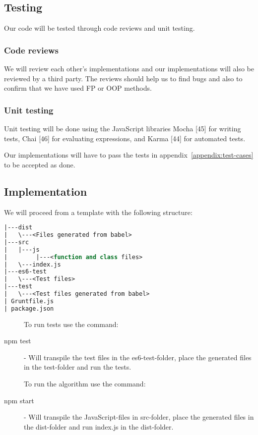 \documentclass {article}
\begin{document}
\subsection{Testing}
Our code will be tested through code reviews and unit testing.
\subsubsection{Code reviews}
We will review each other’s implementations and our implementations will also be reviewed by a third party. The reviews should help us to find bugs and also to confirm that we have used FP or OOP methods.
\subsubsection{Unit testing}
Unit testing will be done using the JavaScript libraries Mocha [45] for writing tests, Chai [46] for evaluating expressions, and Karma [44] for automated tests.

Our implementations will have to pass the tests in appendix~\ref{appendix:test-cases} to be accepted as done.
\subsection{Implementation}
We will proceed from a template with the following structure:

\begin{lstlisting}[language=Pascal, deletekeywords={function, and}, numbers=none]
|---dist
|   \---<Files generated from babel>
|---src
|   |---js
|        |---<function and class files>
|   \---index.js
|---es6-test
|   \---<Test files>
|---test
|   \---<Test files generated from babel>
| Gruntfile.js
| package.json
\end{lstlisting}

\begin{description}
\item[] To run tests use the command:
\item[npm test] - Will transpile the test files in the es6-test-folder, place the generated files in the test-folder and run the tests.
\item[] To run the algorithm use the command:
\item[npm start] - Will transpile the JavaScript-files in src-folder, place the generated files in the dist-folder and run index.js in the dist-folder.
\end{description}
\end{document}
